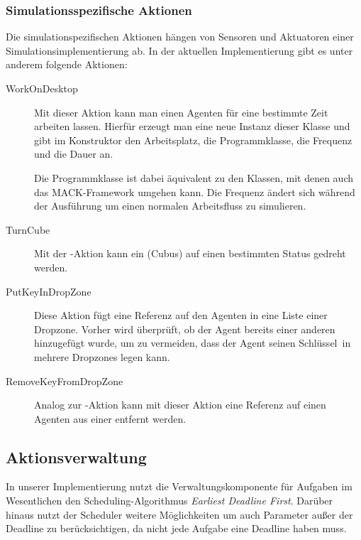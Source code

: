 \subsubsection{Simulationsspezifische Aktionen}
Die simulationspezifischen Aktionen hängen von Sensoren und Aktuatoren einer Simulationsimplementierung ab. In der aktuellen Implementierung gibt es unter anderem folgende Aktionen:
\begin{description}
	\item[WorkOnDesktop] Mit dieser Aktion kann man einen Agenten für eine bestimmte Zeit arbeiten lassen. Hierfür erzeugt man eine neue Instanz dieser Klasse und gibt im Konstruktor den Arbeitsplatz, die Programmklasse, die Frequenz und die Dauer an.
	
	Die Programmklasse ist dabei äquivalent zu den Klassen, mit denen auch das MACK-Framework umgehen kann. Die Frequenz ändert sich während der Ausführung um einen normalen Arbeitsfluss zu simulieren.
	\item[TurnCube] Mit der -Aktion kann ein  (Cubus) auf einen bestimmten Status gedreht werden.
	\item[PutKeyInDropZone] Diese Aktion fügt eine Referenz auf den Agenten in eine Liste einer Dropzone. Vorher wird überprüft, ob der Agent bereits einer anderen  hinzugefügt wurde, um zu vermeiden, dass der Agent seinen \glqq Schlüssel\grqq\ in mehrere Dropzones legen kann.
	\item[RemoveKeyFromDropZone] Analog zur -Aktion kann mit dieser Aktion eine Referenz auf einen Agenten aus einer  entfernt werden.
\end{description}

\subsection{Aktionsverwaltung}\label{subsec:real_actionhandling}
In unserer Implementierung nutzt die Verwaltungskomponente für Aufgaben im Wesentlichen den Scheduling-Algorithmus \emph{Earliest Deadline First}. Darüber hinaus nutzt der Scheduler weitere Möglichkeiten um auch Parameter außer der Deadline zu berücksichtigen, da nicht jede Aufgabe eine Deadline haben muss. 


